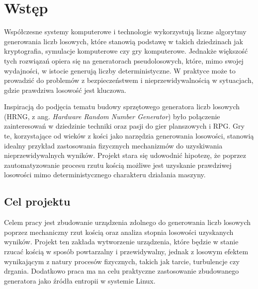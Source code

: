 \chapter{Wstęp}\label{ch:wstep}


Współczesne systemy komputerowe i technologie wykorzystują liczne algorytmy generowania liczb losowych, które stanowią podstawę w takich dziedzinach jak kryptografia,
symulacje komputerowe czy gry komputerowe.
Jednakże większość tych rozwiązań opiera się na generatorach pseudolosowych,
które, mimo swojej wydajności, w istocie generują liczby deterministyczne.
W praktyce może to prowadzić do problemów z bezpieczeństwem i nieprzewidywalnością w sytuacjach, gdzie prawdziwa losowość jest kluczowa.

Inspiracją do podjęcia tematu budowy sprzętowego generatora liczb losowych (HRNG, z ang. \textit{Hardware Random Number Generator})
było połączenie zainteresowań w dziedzinie techniki oraz pasji do gier planszowych i RPG. %
Gry te, korzystające od wieków z kości jako narzędzia generowania losowości, stanowią idealny przykład zastosowania fizycznych mechanizmów do uzyskiwania nieprzewidywalnych wyników.
Projekt stara się udowodnić hipotezę, że poprzez zautomatyzowanie procesu rzutu kością możliwe jest uzyskanie prawdziwej losowości mimo deterministycznego charakteru działania maszyny.

\section{Cel projektu}\label{sec:cel-projektu}

Celem pracy jest zbudowanie urządzenia zdolnego do generowania liczb losowych poprzez mechaniczny rzut kością oraz analiza stopnia losowości uzyskanych wyników.
Projekt ten zakłada wytworzenie urządzenia, które będzie w stanie rzucać kością w sposób powtarzalny i przewidywalny,
jednak z losowym efektem wynikającym z natury procesów fizycznych, takich jak tarcie, turbulencje czy drgania.
Dodatkowo praca ma na celu praktyczne zastosowanie zbudowanego generatora jako źródła entropii w systemie Linux.

